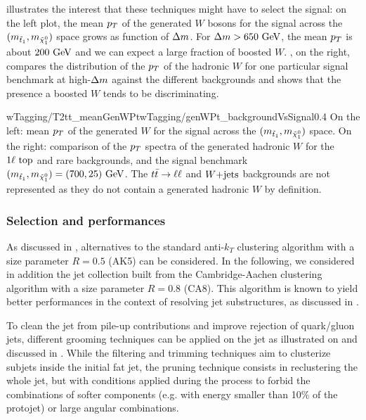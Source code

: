               illustrates the interest that these techniques might have to
             select the signal: on the left plot, the mean $p_T$ of the generated
             $W$ bosons for the signal across the $(m_{\tilde{t}_1}, m_{\tilde{\chi}_1^0})$
             space grows as function of $\Delta m$. For $\Delta m > 650~\text{GeV}$, the
             mean $p_T$ is about $200~\text{GeV}$ and we can expect a large fraction of boosted $W$.
             , on the right, compares the distribution of the $p_T$ of the
             hadronic $W$ for one particular signal benchmark at high-$\Delta m$ against
             the different backgrounds and shows that the presence a boosted $W$ tends to
             be discriminating.

                              {wTagging/T2tt_meanGenWPt}{wTagging/genWPt_backgroundVsSignal}{0.4}
                              {On the left: mean $p_T$ of the generated $W$ for the
                              signal across the $(m_{\tilde{t}_1}, m_{\tilde{\chi}_1^0})$ space.
                              On the right: comparison of the $p_T$ spectra of the generated
                              hadronic $W$ for the $1\ell~\text{top}$ and rare backgrounds, and
                              the signal benchmark $(m_{\tilde{t}_1}, m_{\tilde{\chi}_1^0}) = (700,25) ~\text{GeV}$.
                              The $t\bar{t} \rightarrow \ell \ell$ and $\text{$W$+jets}$ backgrounds are not represented
                              as they do not contain a generated hadronic $W$ by definition.}

            \subsubsection{Selection and performances}

            As discussed in , alternatives to the
            standard anti-$k_T$ clustering algorithm with a size parameter $R = 0.5$
            (AK5) can be considered. In the following, we considered in addition the jet
            collection built from the Cambridge-Aachen clustering algorithm with a size
            parameter $R = 0.8$ (CA8). This algorithm is known to yield better performances
            in the context of resolving jet substructures, as discussed in
            \cite{jetSubstructureSalam, jetClusteringComparison}.

            To clean the jet from pile-up contributions and improve rejection of
            quark/gluon jets, different grooming techniques can be applied on the jet
            as illustrated on  and discussed in
            \cite{jetClusteringComparison, JME-13-006}.
            While the filtering and trimming techniques aim to clusterize subjets inside
            the initial fat jet, the pruning technique consists in reclustering the whole
            jet, but with conditions applied during the process to forbid the combinations
            of softer components (e.g. with energy smaller than 10\% of the protojet) or
            large angular combinations.

